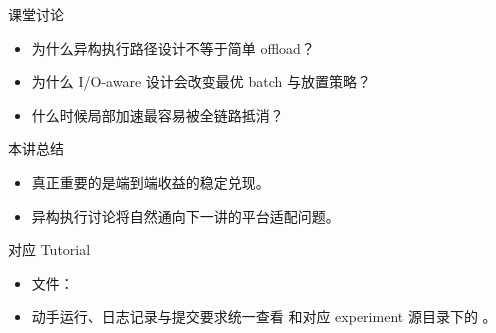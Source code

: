 

\begin{frame}{课堂讨论}
  \begin{itemize}
    \item 为什么异构执行路径设计不等于简单 offload？
    \item 为什么 I/O-aware 设计会改变最优 batch 与放置策略？
    \item 什么时候局部加速最容易被全链路抵消？
  \end{itemize}
\end{frame}

\begin{frame}{本讲总结}
  \begin{itemize}
    \item 真正重要的是端到端收益的稳定兑现。
    \item 异构执行讨论将自然通向下一讲的平台适配问题。
  \end{itemize}
\end{frame}

\begin{frame}{对应 Tutorial}
  \begin{itemize}
    \item 文件：\texttt{}
    \item 动手运行、日志记录与提交要求统一查看 \texttt{} 和对应 experiment 源目录下的 \texttt{}。
  \end{itemize}
\end{frame}

